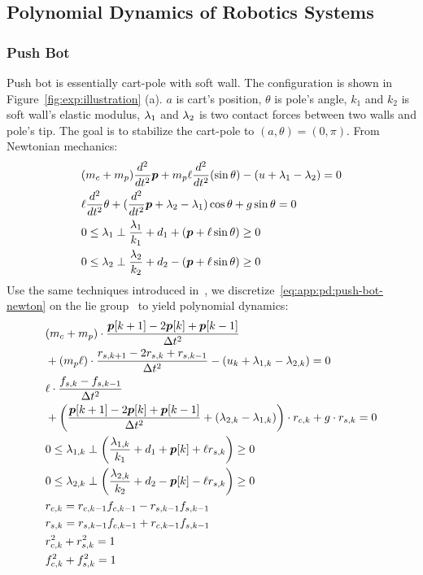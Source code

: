 \subsection{Polynomial Dynamics of Robotics Systems}
\label{app:sec:polynomial-dynamics}

\subsubsection{Push Bot}
\label{app:pd:push-bot}
Push bot is essentially cart-pole with soft wall. The configuration is shown in Figure~\ref{fig:exp:illustration} (a). $a$ is cart's position, $\theta$ is pole's angle, $k_1$ and $k_2$ is soft wall's elastic modulus, $\lamone$ and $\lamtwo$ is two contact forces between two walls and pole's tip. The goal is to stabilize the cart-pole to $(a,\theta) = (0, \pi)$.
From Newtonian mechanics:
\begin{align}
    \label{eq:app:pd:push-bot-newton}
    & (\mcar + \mpole) \frac{d^2}{dt^2}\pos + \mpole \len \frac{d^2}{dt^2}(\sin\theta) - (u + \lamone - \lamtwo) = 0 \\
    & \len \frac{d^2}{dt^2}\theta + (\frac{d^2}{dt^2}\pos + \lamtwo - \lamone) \cos\theta + g \sin\theta = 0 \\
    & 0 \le \lamone \perp \frac{\lamone}{k_1} + d_1 + (\pos + \len \sin\theta) \ge 0 \\
    & 0 \le \lamtwo \perp \frac{\lamtwo}{k_2} + d_2 - (\pos + \len \sin\theta) \ge 0 
\end{align}
Use the same techniques introduced in~\cite{teng2023arxiv-geometricmotionplanning-liegroup}, we discretize~\eqref{eq:app:pd:push-bot-newton} on the lie group~\cite{lee2008thesis-computationalgeometricmechanics} to yield polynomial dynamics:
\begin{align}
    \label{eq:app:pd:push-bot-liegroup}
    & (\mcar + \mpole) \cdot \frac{\pos[k+1] - 2\pos[k] + \pos[k-1]}{\dt^2} \nonumber \\ 
    & + (\mpole \len) \cdot \frac{\rs[k+1] - 2 \rs[k] + \rs[k-1]}{\dt^2} - (u_k + \lamone[k] - \lamtwo[k]) = 0 \\
    & \len \cdot \frac{\fs[k] - \fs[k-1]}{\dt^2} \nonumber \\
    & + \left( 
        \frac{\pos[k+1] - 2\pos[k] + \pos[k-1]}{\dt^2} + (\lamtwo[k] - \lamone[k])
     \right) \cdot \rc[k] + g \cdot \rs[k] = 0 \\
    & 0 \le \lamone[k] \perp \left( \frac{\lamone[k]}{k_1} + d_1 + \pos[k] + \len \rs[k] \right) \ge 0 \\
    & 0 \le \lamtwo[k] \perp \left( \frac{\lamtwo[k]}{k_2} + d_2 - \pos[k] - \len \rs[k] \right) \ge 0 \\
    & \rc[k] = \rc[k-1] \fc[k-1] - \rs[k-1] \fs[k-1] \label{eq:app:pd:2d-liegroup-start} \\
    & \rs[k] = \rs[k-1] \fc[k-1] + \rc[k-1] \fs[k-1] \\
    & \rc[k]^2 + \rs[k]^2 = 1 \\
    & \fc[k]^2 + \fs[k]^2 = 1 \label{eq:app:pd:2d-liegroup-end}
\end{align}
